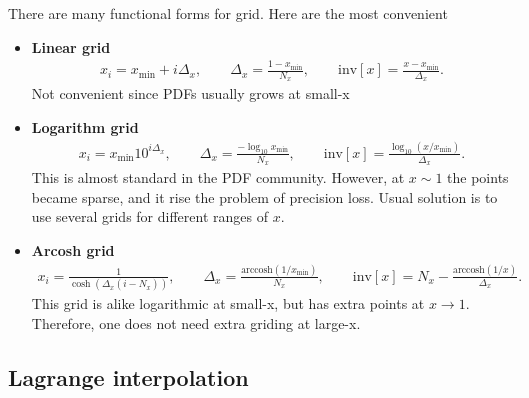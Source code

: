 \documentclass[prd,nofootinbib,eqsecnum,final]{revtex4}
\renewcommand{\(}{\left(}
\renewcommand{\)}{\right)}
\renewcommand{\[}{\left[}
\renewcommand{\]}{\right]}
\begin{document}
There are many functional forms for grid. Here are the most convenient
\begin{itemize}
\item \textbf{Linear grid} 
\begin{eqnarray}
x_i=x_{\text{min}}+i\Delta_x,\qquad \Delta_x=\frac{1-x_{\text{min}}}{N_x},\qquad \text{inv}[x]=\frac{x-x_{\text{min}}}{\Delta_x}.
\end{eqnarray}
Not convenient since PDFs usually grows at small-x
\item \textbf{Logarithm grid} 
\begin{eqnarray}
x_i=x_{\text{min}}10^{i\Delta_x},\qquad \Delta_x=\frac{-\log_{10} x_{\text{min}}}{N_x},\qquad \text{inv}[x]=\frac{\log_{10}(x/x_{\text{min}})}{\Delta_x}.
\end{eqnarray}
This is almost standard in the PDF community. However, at $x\sim 1$ the points became sparse, and it rise the problem of precision loss. Usual solution is to use several grids for different ranges of $x$.
\item \textbf{Arcosh grid} 
\begin{eqnarray}
x_i=\frac{1}{\cosh\(\Delta_x(i-N_x)\)},\qquad \Delta_x=\frac{\text{arccosh}(1/x_{\text{min}})}{N_x},\qquad \text{inv}[x]=
N_x-\frac{\text{arccosh}(1/x)}{\Delta_x}.
\end{eqnarray}
This grid is alike logarithmic at small-x, but has extra points at $x\to 1$. Therefore, one does not need extra griding at large-x.
\end{itemize}

\subsection{Lagrange interpolation}
\end{document}
